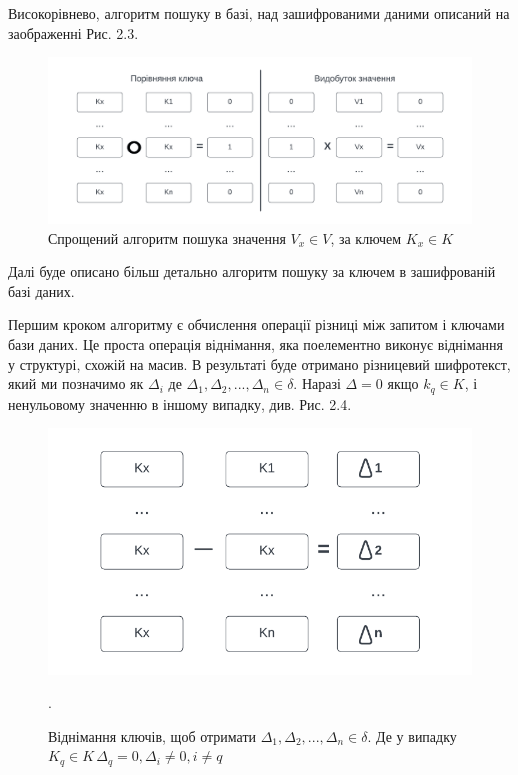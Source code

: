 \begin{itemize}
{    Високорівнево, алгоритм пошуку в базі, над зашифрованими даними описаний на заображенні
    Рис. 2.3.

\begin{figure}[!ht]
    \label{fig:basic-value-extraction}
    \includegraphics[scale=0.85]{static/basic-value-extraction.png} 
    \caption{Спрощений алгоритм пошука значення \(V_x \in V\), за ключем \(K_x \in K\)}
\end{figure}

    Далі буде описано більш детально алгоритм пошуку за ключем в зашифрованій базі даних.
    
    Першим кроком алгоритму є обчислення операції різниці між запитом і ключами бази даних. Це
    проста операція віднімання, яка поелементно виконує віднімання у структурі, схожій на масив. В
    результаті буде отримано різницевий шифротекст, який ми позначимо як \(\Delta_i\) де
\(\Delta_1,\Delta_2,...,\Delta_n \in \delta\). Наразі 
    \(\Delta = 0\) якщо \(k_q \in K\), і ненульовому значенню в іншому випадку, див. Рис. 2.4.

\begin{figure}[!ht]
    \centering
    \label{fig:key-subsruction}
    \includegraphics[scale=1.25]{static/key-substruction.png}
    \caption{Віднімання ключів, щоб отримати \(\Delta_1,\Delta_2,...,\Delta_n \in \delta\).
    Де у випадку \(K_q \in K\, \Delta_q = 0, \Delta_i \neq 0, i \neq q\)}.
\end{figure}


}
\end{itemize}
